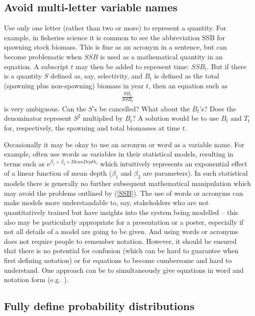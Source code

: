 \documentclass[12pt]{article}
\newcommand{\eb}{\begin{eqnarray}}
\newcommand{\ee}{\end{eqnarray}}
\begin{document}
\subsection*{Avoid multi-letter variable names}

Use only one letter (rather than two or more) to represent a quantity.
For example, in fisheries science
it is common to see the abbreviation SSB for spawning stock biomass. 
This is fine as an acronym in a sentence, but can become problematic when
$SSB$ is used as a mathematical quantity in an equation. A subscript $t$ 
may then be added to represent time: $SSB_t$. But if there is a 
quantity
$S$ defined as, say, selectivity, and $B_t$ is defined as the total (spawning
plus non-spawning) biomass in year $t$, then an equation such as
\eb
\frac{S B_t}{SSB_t}
\label{SSB}
\ee
is very ambiguous. Can the $S$'s be cancelled? What about the $B_t$'s? Does
the denominator represent $S^2$ multiplied by $B_t$? A solution would be to use
$B_t$ and $T_t$ for, respectively, the spawning and
total biomasses at time $t$.

Occasionally it may be okay to use an acronym or word as a variable name.
For example, \citet{zuur13} often use words
as variables in their statistical models, resulting in terms such as
$\mbox{e}^{\beta_1 + \beta_2 \times MeanDepth_i}$
which intuitively represents an exponential effect of a linear 
function of mean depth ($\beta_1$ and $\beta_2$ are parameters). 
In such statistical models there is generally no further subsequent mathematical 
manipulation which may avoid the problems outlined by (\ref{SSB}). 
The use of words or acronyms can make models more understandable to, say,
stakeholders who are not quantitatively trained but
have insights into the system being modelled -- this also may be particularly
appropriate for a presentation or a poster, especially if not all details of
a model are going to be given.
And using words
or acronyms does not require people to remember notation.
However, it should be ensured that 
there is no potential for confusion (which can be hard to guarantee when
first defining notation) or for equations to become cumbersome
and hard to understand. One approach can be to simultaneously
give equations in word and notation form (e.g.~\citealt{eb96}).

\subsection*{Fully define probability distributions}
\end{document}
